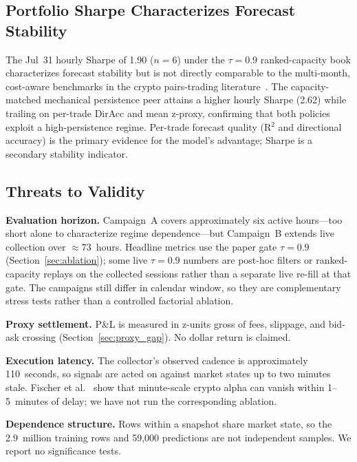 \subsection{Portfolio Sharpe Characterizes Forecast Stability}

The Jul~31 hourly Sharpe of 1.90 ($n=6$) under the $\tau{=}0.9$ ranked-capacity book characterizes forecast stability but is not directly comparable to the multi-month, cost-aware benchmarks in the crypto pairs-trading literature~\cite{tadi2021evaluation, tadi2025copula}. The capacity-matched mechanical persistence peer attains a higher hourly Sharpe (2.62) while trailing on per-trade DirAcc and mean z-proxy, confirming that both policies exploit a high-persistence regime. Per-trade forecast quality (R$^2$ and directional accuracy) is the primary evidence for the model's advantage; Sharpe is a secondary stability indicator.

\subsection{Threats to Validity}\label{sec:limitations}

\textbf{Evaluation horizon.} Campaign~A covers approximately six active hours---too short alone to characterize regime dependence---but Campaign~B extends live collection over $\approx$73~hours. Headline metrics use the paper gate $\tau{=}0.9$ (Section~\ref{sec:ablation}); some live $\tau{=}0.9$ numbers are post-hoc filters or ranked-capacity replays on the collected sessions rather than a separate live re-fill at that gate. The campaigns still differ in calendar window, so they are complementary stress tests rather than a controlled factorial ablation.

\textbf{Proxy settlement.} P\&L is measured in z-units gross of fees, slippage, and bid-ask crossing (Section~\ref{sec:proxy_gap}). No dollar return is claimed.

\textbf{Execution latency.} The collector's observed cadence is approximately 110~seconds, so signals are acted on against market states up to two minutes stale. Fischer et al.~\cite{fischer2019statistical} show that minute-scale crypto alpha can vanish within 1--5~minutes of delay; we have not run the corresponding ablation.

\textbf{Dependence structure.} Rows within a snapshot share market state, so the 2.9~million training rows and 59{,}000 predictions are not independent samples. We report no significance tests.
